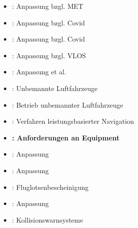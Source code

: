     \begin{itemize}
        \item {} : Anpassung  bzgl. \acs{MET} %
        \item {} : Anpassung  bzgl. Covid  %
        \item {}  : Anpassung  bzgl. Covid  %
        \item {}  : Anpassung  bzgl. \acs{VLOS}  %
        \item {}  : Anpassung  {\footnotesize et al.}   %
        \item {}  : Unbemannte Luftfahrzeuge %
        \item {}  : Betrieb unbemannter Luftfahrzeuge %
        \item {} : Verfahren leistungsbasierter Navigation %
        \item \textbf{ : Anforderungen an \atmans{} Equipment}%
        \item {} : Anpassung  %
        \item {}  : Anpassung  %
        \item {}  : Fluglotsenbescheinigung %
        \item {}  : Anpassung  %
        \item {} : Kollisionswarnsysteme %
    \end{itemize}
